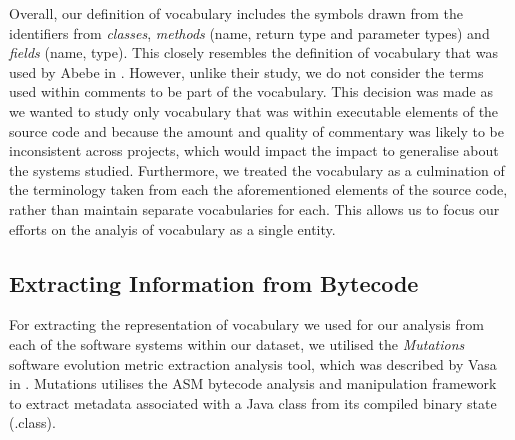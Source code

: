Overall, our definition of vocabulary includes the symbols drawn from the identifiers from \emph{classes}, \emph{methods} (name, return type and parameter types) and \emph{fields} (name, type). This closely resembles the definition of vocabulary that was used by Abebe \etal in \cite{Abebe09a}. However, unlike their study, we do not consider the terms used within comments to be part of the vocabulary. This decision was made as we wanted to study only vocabulary that was within executable elements of the source code and because the amount and quality of commentary was likely to be inconsistent across projects, which would impact the impact to generalise about the systems studied. Furthermore, we treated the vocabulary as a culmination of the terminology taken from each the aforementioned elements of the source code, rather than maintain separate vocabularies for each. This allows us to focus our efforts on the analyis of vocabulary as a single entity.



\subsection{Extracting Information from Bytecode} %
\label{sub:extracting_information_from_bytecode}

For extracting the representation of vocabulary we used for our analysis from each of the software systems within our dataset, we utilised the \emph{Mutations} software evolution metric extraction analysis tool, which was described by Vasa in \cite{Vasa10a}. Mutations utilises the ASM bytecode analysis and manipulation framework to extract metadata associated with a Java class from its compiled binary state (.class).


